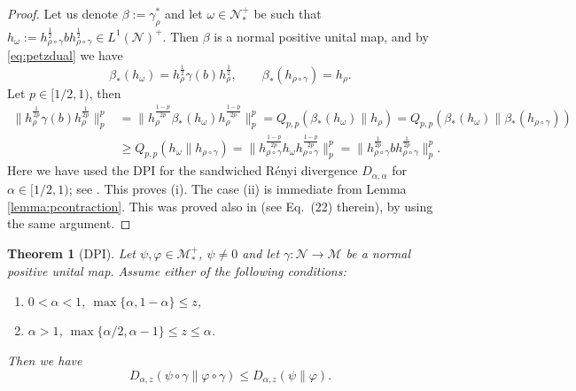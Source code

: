 \documentclass[12pt]{article}
\newtheorem{theorem}{Theorem}[section]
\theoremstyle{definition}
\theoremstyle{remark}
\numberwithin{equation}{section}
\def\Me{\mathcal M}
\def\Ne{\mathcal N}
\begin{document}
\begin{proof} Let us denote $\beta:=\gamma_\rho^*$ and let $\omega\in {\Ne_*^+}$ be such
that 
$h_\omega:=h_{\rho\circ\gamma}^{\frac12}bh_{\rho\circ\gamma}^{\frac12}\in L^1(\Ne)^+$. Then
$\beta$ is a normal positive unital map, and {by \eqref{eq:petzdual}} we have
\[
\beta_*(h_\omega)=h_\rho^{\frac12}\gamma(b)h_\rho^{\frac12},\qquad
\beta_*(h_{\rho\circ\gamma})=h_\rho.
\]
Let $p\in [1/2,1)$, then  
\begin{align*}
\Big\|h_{\rho}^{\frac{1}{2p}}\gamma(b)h_{\rho}^{\frac{1}{2p}}\Big\|^p_p
&=\Big\|h_\rho^{\frac{1-p}{2p}}\beta_*(h_\omega)h_\rho^{\frac{1-p}{2p}}\Big\|_p^p
=Q_{p,p}(\beta_*(h_\omega)\|h_\rho)=Q_{p,p}(\beta_*(h_\omega)\|\beta_*(h_{\rho\circ\gamma}))\\
&\ge  Q_{p,p}(h_\omega\|h_{\rho\circ\gamma})=\Big\|h_{\rho\circ\gamma}^{\frac{1-p}{2p}}h_\omega
h_{\rho\circ\gamma}^{\frac{1-p}{2p}}\Big\|_p^p
=\Big\|h_{\rho\circ\gamma}^{\frac{1}{2p}}bh_{\rho\circ\gamma}^{\frac{1}{2p}}\Big\|^p_p.
\end{align*}
Here we have used the DPI for the sandwiched R\'enyi  divergence $D_{\alpha,\alpha}$ for
$\alpha\in [1/2,1)$; see \cite[Theorem 4.1]{jencova2021renyi}. This proves (i).
The case (ii) is immediate from Lemma \ref{lemma:pcontraction}. This was proved also 
in \cite{kato2023onrenyi} (see Eq.~(22) therein), by using the same argument.
\end{proof}

\begin{theorem}[DPI] \label{thm:dpi}
Let $\psi,\varphi\in \Me_*^+$, $\psi\ne 0$ and let $\gamma:\Ne\to \Me$ be a normal positive
unital map. Assume either of the following conditions:
\begin{enumerate}
\item[(i)] $0<\alpha<1$, $\max\{\alpha,1-\alpha\}\le z$,
\item[(ii)] $\alpha>1$, $\max\{\alpha/2,\alpha-1\}\le z\le \alpha$.
\end{enumerate}
Then we have
\[
D_{\alpha,z}(\psi\circ\gamma\|\varphi\circ\gamma)\le D_{\alpha,z}(\psi\|\varphi).
\]
\end{theorem}
\end{document}
